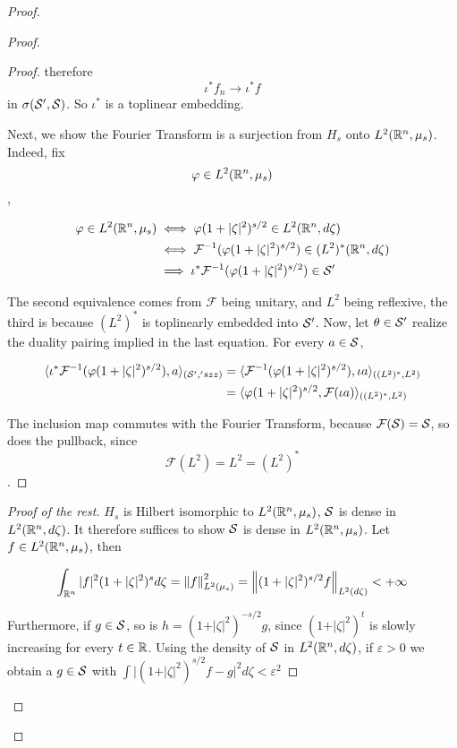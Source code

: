 \documentclass[../main-manifolds.tex]{subfiles}
\begin{document}
{{\begin{proof}
{{\begin{proof}
\begin{proof}
therefore $$\iota^*f_n\to \iota^*f$$ in $\sigma(\mathcal{S}', \mathcal{S})$. So $\iota^*$ is a toplinear embedding. 

Next, we show the Fourier Transform is a surjection from $H_s$ onto $L^2({\mathbb{R}^n},\mu_s)$. Indeed, fix $$\varphi\in L^2({\mathbb{R}^n},\mu_s)$$,

$$
\begin{align}
\varphi\in L^2({\mathbb{R}^n},\mu_s)&\iff \varphi(1+\vert\zeta\vert^2)^{s/2}\in L^2({\mathbb{R}^n}, d\zeta)\\
&\iff \mathcal{F}^{-1}(\varphi(1+\vert\zeta\vert^2)^{s/2} )\in (L^2)^*({\mathbb{R}^n},d\zeta)\\
&\implies \iota^*\mathcal{F}^{-1}(\varphi(1+\vert\zeta\vert^2)^{s/2} )\in \mathcal{S}' 
\end{align}
$$

The second equivalence comes from $\mathcal{F}$ being unitary, and $L^2$ being reflexive, the third is because $(L^2)^*$ is toplinearly embedded into $\mathcal{S}'$. Now, let $\theta\in\mathcal{S}'$ realize the duality pairing implied in the last equation. For every $a\in \mathcal{S}$, 

$$
\begin{align}
\langle \iota^*\mathcal{F}^{-1}(\varphi(1+\vert\zeta\vert^2)^{s/2}), a\rangle_{(\mathcal{S}','szz)} &=\langle \mathcal{F}^{-1}(\varphi(1+\vert\zeta\vert^2)^{s/2}),\iota a\rangle_{((L^2)^*, L^2)}\\
&=\langle \varphi(1+\vert\zeta\vert^2)^{s/2},\mathcal{F}(\iota a)\rangle_{((L^2)^*, L^2)}
\end{align}
$$

The inclusion map commutes with the Fourier Transform, because $\mathcal{F}(\mathcal{S}) = \mathcal{S}$, so does the pullback, since $$\mathcal{F}(L^2) = L^2 = (L^2)^*$$.
    
\end{proof}
\begin{proof}[Proof of the rest]
$H_s$ is Hilbert isomorphic to $L^2({\mathbb{R}^n},\mu_s)$, $\mathcal{S}$ is dense in $L^2({\mathbb{R}^n},d\zeta)$. It therefore suffices to show $\mathcal{S}$ is dense in $L^2({\mathbb{R}^n}, \mu_s)$. Let $f\in L^2({\mathbb{R}^n},\mu_s)$, then

$$
\int_{{\mathbb{R}^n}}\vert f\vert^2 (1+\vert\zeta\vert^2)^{s}d\zeta = \norm{f}^2_{L^2(\mu_s)} = \norm{(1+\vert\zeta\vert^2)^{s/2} f}_{L^2(d\zeta)}<+\infty
$$

Furthermore, if $g\in \mathcal{S}$, so is $h = (1+\vert\zeta\vert^2)^{-s/2}g$, since $(1+\vert\zeta\vert^2)^{t}$ is slowly increasing for every $t\in\mathbb{R}$. Using the density of $\mathcal{S}$ in $L^2({\mathbb{R}^n}, d\zeta)$, if $\varepsilon>0$ we obtain a $g\in\mathcal{S}$ with $\int \vert (1+\vert\zeta\vert^2)^{s/2}f - g\vert^2d\zeta < \varepsilon^2$


\end{proof}
\end{proof}}}
\end{proof}}}
\end{document}
